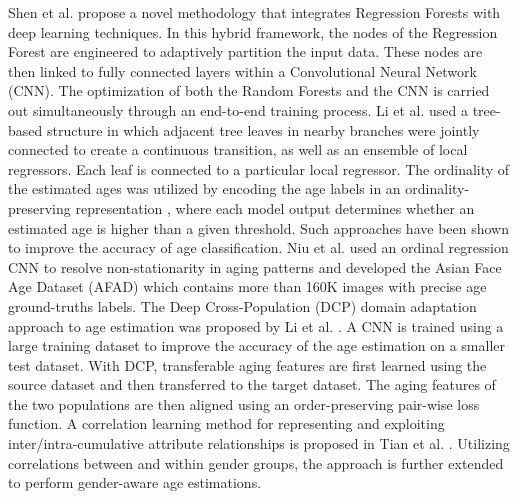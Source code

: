 \documentclass[10pt,journal]{IEEEtran}\usepackage{amsfonts}
\begin{document}
Shen et al. \cite{8578343} propose a novel methodology that integrates
Regression Forests with deep learning techniques. In this hybrid framework,
the nodes of the Regression Forest are engineered to adaptively partition the
input data. These nodes are then linked to fully connected layers within a
Convolutional Neural Network (CNN). The optimization of both the Random
Forests and the CNN is carried out simultaneously through an end-to-end
training process. Li et al. \cite{8954134} used a tree-based structure in
which adjacent tree leaves in nearby branches were jointly connected to create
a continuous transition, as well as an ensemble of local regressors. Each leaf
is connected to a particular local regressor. The ordinality of the estimated
ages was utilized by encoding the age labels in an ordinality-preserving
representation \cite{8099569, 7780901, 9145576, coral}, where each model
output determines whether an estimated age is higher than a given threshold.
Such approaches have been shown to improve the accuracy of age classification.
Niu et al. \cite{7780901} used an ordinal regression CNN to resolve
non-stationarity in aging patterns and developed the Asian Face Age Dataset
(AFAD) which contains more than 160K images with precise age ground-truths
labels. The Deep Cross-Population (DCP) domain adaptation approach to age
estimation was proposed by Li et al. \cite{8578147}. A CNN is trained using a
large training dataset to improve the accuracy of the age estimation on a
smaller test dataset. With DCP, transferable aging features are first learned
using the source dataset and then transferred to the target dataset. The aging
features of the two populations are then aligned using an order-preserving
pair-wise loss function. A correlation learning method for representing and
exploiting inter/intra-cumulative attribute relationships is proposed in Tian
et al. \cite{TianCCY19}. Utilizing correlations between and within gender
groups, the approach is further extended to perform gender-aware age estimations.
\end{document}
